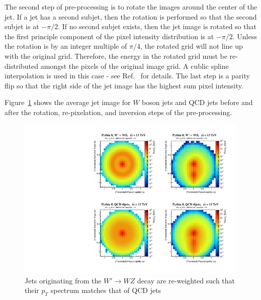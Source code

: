 The second step of pre-processing is to rotate the images around the center of the jet.  If a jet has a second subjet, then the rotation is performed so that the second subjet is at $-\pi/2$.  If no second subjet exists, then the jet image is rotated so that the first principle component of the pixel intensity distribution is at $-\pi/2$.  Unless the rotation is by an integer multiple of $\pi/4$, the rotated grid will not line up with the original grid.  Therefore, the energy in the rotated grid must be re-distributed amongst the pixels of the original image grid.  A cublic spline interpolation is used in this case - see Ref.~\cite{Cogan:2014oua} for details.  The last step is a parity flip so that the right side of the jet image has the highest sum pixel intensity.  

Figure~\ref{fig:preprocess} shows the average jet image for $W$ boson jets and QCD jets before and after the rotation, re-pixelation, and inversion steps of the pre-processing.



\begin{figure}[bt]
  \begin{center}
        \includegraphics[width=0.99\textwidth]{figures/Image_mass_average_fixed_nonorm.pdf}
      \caption{ Jets originating from the $W'\rightarrow WZ$ decay are re-weighted such that their $p_T$ spectrum matches that of QCD jets\label{fig:preprocess} }
    \end{center}
\end{figure}

\clearpage
\newpage

